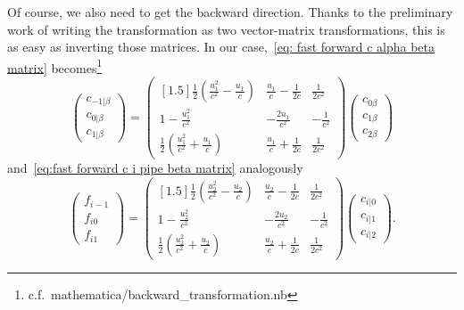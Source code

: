 Of course, we also need to get the backward direction.
Thanks to the preliminary work of writing the transformation as two vector-matrix transformations, this is as easy as inverting those matrices.
In our case,~\eqref{eq: fast forward c alpha beta matrix} becomes\footnote{c.f.\ mathematica/backward\_transformation.nb}
\begin{equation}
  \begin{pmatrix}
    c_{-1|\beta} \\
    c_{0|\beta} \\
    c_{1|\beta}
  \end{pmatrix}
  =  \begin{pmatrix}[1.5]
    \frac{1}{2}\left(\frac{u_1^2}{c^2}-\frac{u_1}{c}\right)
    & \frac{u_1}{c} - \frac{1}{2c}
    & \frac{1}{2 c^2}
    \\
    1-\frac{u_1^2}{c^2}
    & -\frac{2 u_1}{c^2}
    & -\frac{1}{c^2}
    \\
    \frac{1}{2}\left(\frac{u_1^2}{c^2}+\frac{u_1}{c}\right)
    & \frac{u_1}{c} + \frac{1}{2c}
    & \frac{1}{2 c^2}
  \end{pmatrix}
  \begin{pmatrix}
    c_{0\beta} \\
    c_{1\beta} \\
    c_{2\beta}
  \end{pmatrix}
\end{equation}
and~\eqref{eq:fast forward c i pipe beta matrix} analogously
\begin{equation}
  \begin{pmatrix}
    f_{i-1} \\
    f_{i0} \\
    f_{i1}
  \end{pmatrix}
  =
  \begin{pmatrix}[1.5]
    \frac{1}{2}\left(\frac{u_2^2}{c^2}-\frac{u_2}{c}\right) 
    & \frac{u_2}{c} - \frac{1}{2c} 
    & \frac{1}{2 c^2}
    \\
    1-\frac{u_2^2}{c^2} 
    & -\frac{2 u_2}{c^2} 
    & -\frac{1}{c^2}
    \\
    \frac{1}{2}\left(\frac{u_2^2}{c^2}+\frac{u_2}{c}\right) 
    & \frac{u_2}{c} + \frac{1}{2c} 
    & \frac{1}{2 c^2}
  \end{pmatrix}
  \begin{pmatrix}
      c_{i|0} \\
      c_{i|1} \\
      c_{i|2}
    \end{pmatrix}.
\end{equation}
